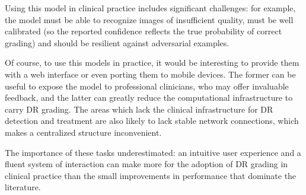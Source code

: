 Using this model in clinical practice includes significant challenges: for example, the model must be able to recognize images of insufficient quality, must be well calibrated (so the reported confidence reflects the true probability of correct grading) and should be resilient against adversarial examples. 

Of course, to use this models in practice, it would be interesting to provide them with a web interface or even porting them to mobile devices. The former can be useful to expose the model to professional clinicians, who may offer invaluable feedback, and the latter can greatly reduce the computational infrastructure to carry DR grading. The areas which lack the clinical infrastructure for DR detection and treatment are also likely to lack stable network connections, which makes a centralized structure inconvenient. 

The importance of these tasks underestimated: an intuitive user experience and a fluent system of interaction can make more for the  adoption of DR grading in clinical practice than the small improvements in performance that dominate the literature.

